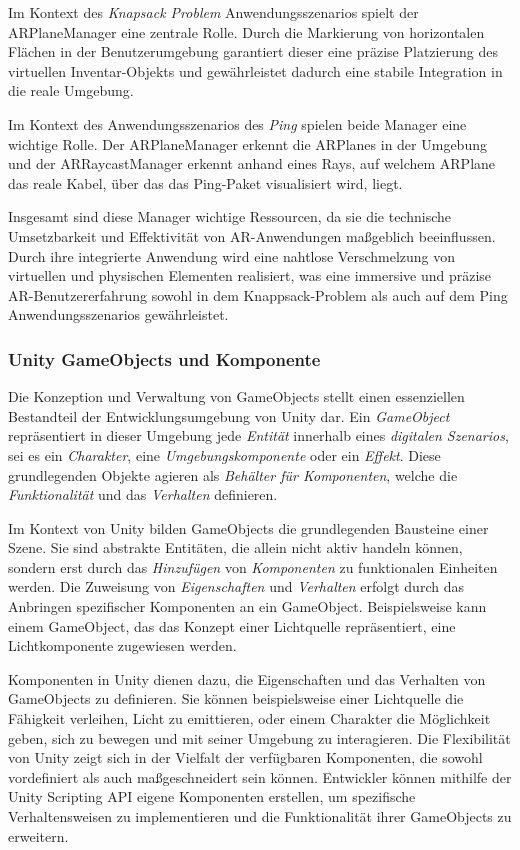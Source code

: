 Im Kontext des \textit{Knapsack Problem} Anwendungsszenarios spielt der ARPlaneManager eine zentrale Rolle. Durch die
Markierung von horizontalen Flächen in der Benutzerumgebung garantiert dieser eine präzise Platzierung des virtuellen
Inventar-Objekts und gewährleistet dadurch eine stabile Integration in die reale Umgebung.

Im Kontext des Anwendungsszenarios des \textit{Ping} spielen beide Manager eine wichtige Rolle. Der ARPlaneManager erkennt
die ARPlanes in der Umgebung und der ARRaycastManager erkennt anhand eines Rays, auf welchem ARPlane das reale Kabel, über
das das Ping-Paket visualisiert wird, liegt.

Insgesamt sind diese Manager wichtige Ressourcen, da sie die technische Umsetzbarkeit und Effektivität von AR-Anwendungen
maßgeblich beeinflussen. Durch ihre integrierte Anwendung wird eine nahtlose Verschmelzung von virtuellen und physischen
Elementen realisiert, was eine immersive und präzise AR-Benutzererfahrung sowohl in dem Knappsack-Problem als auch auf
dem Ping Anwendungsszenarios gewährleistet.

\subsubsection{Unity GameObjects und Komponente}
Die Konzeption und Verwaltung von GameObjects stellt einen essenziellen Bestandteil der Entwicklungsumgebung von Unity dar.
Ein \textit{GameObject} repräsentiert in dieser Umgebung jede \textit{Entität} innerhalb eines \textit{digitalen Szenarios},
sei es ein \textit{Charakter}, eine \textit{Umgebungskomponente} oder ein \textit{Effekt}. Diese grundlegenden Objekte
agieren als \textit{Behälter für Komponenten}, welche die \textit{Funktionalität} und das \textit{Verhalten} definieren.

Im Kontext von Unity bilden GameObjects die grundlegenden Bausteine einer Szene. Sie sind abstrakte Entitäten, die allein
nicht aktiv handeln können, sondern erst durch das \textit{Hinzufügen} von \textit{Komponenten} zu funktionalen Einheiten werden. Die Zuweisung
von \textit{Eigenschaften} und \textit{Verhalten} erfolgt durch das Anbringen spezifischer Komponenten an ein GameObject.
Beispielsweise kann einem GameObject, das das Konzept einer Lichtquelle repräsentiert, eine Lichtkomponente zugewiesen werden.

Komponenten in Unity dienen dazu, die Eigenschaften und das Verhalten von GameObjects zu definieren. Sie können beispielsweise
einer Lichtquelle die Fähigkeit verleihen, Licht zu emittieren, oder einem Charakter die Möglichkeit geben, sich zu bewegen
und mit seiner Umgebung zu interagieren. Die Flexibilität von Unity zeigt sich in der Vielfalt der verfügbaren Komponenten,
die sowohl vordefiniert als auch maßgeschneidert sein können. Entwickler können mithilfe der Unity Scripting API eigene
Komponenten erstellen, um spezifische Verhaltensweisen zu implementieren und die Funktionalität ihrer GameObjects zu erweitern.

